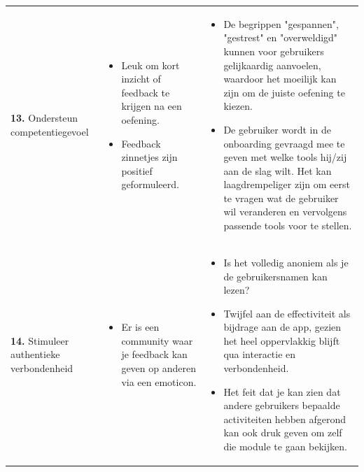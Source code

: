 {\begin{longtable}{
            >{\raggedright\arraybackslash}p{5.23cm}
            >{\raggedright\arraybackslash}p{4.93cm}
            >{\raggedright\arraybackslash}p{4.93cm}
        }
        \addlinespace[5pt]
        
        \textbf{13.} Ondersteun competentiegevoel
        &  
        \begin{itemize}[nosep,leftmargin=*,itemsep=10pt] 
            \renewcommand{\labelitemi}{+} 
            \item Leuk om kort inzicht of feedback te krijgen na een oefening.
            \item Feedback zinnetjes zijn positief geformuleerd.
        \end{itemize} 
        &
        \begin{itemize}[nosep,leftmargin=*,itemsep=10pt] 
            \renewcommand{\labelitemi}{-} 
            \item De begrippen "gespannen", "gestrest" en "overweldigd" kunnen voor gebruikers gelijkaardig aanvoelen, waardoor het moeilijk kan zijn om de juiste oefening te kiezen.
            \item De gebruiker wordt in de onboarding gevraagd mee te geven met welke tools hij/zij aan de slag wilt. Het kan laagdrempeliger zijn om eerst te vragen wat de gebruiker wil veranderen en vervolgens passende tools voor te stellen.
        \end{itemize}
        \\
        
        \addlinespace[5pt]
        
        \textbf{14.} Stimuleer authentieke verbondenheid 
        &  
        \begin{itemize}[nosep,leftmargin=*,itemsep=10pt] 
            \renewcommand{\labelitemi}{+} 
            \item Er is een community waar je feedback kan geven op anderen via een emoticon.
        \end{itemize} 
        &  
        \begin{itemize}[nosep,leftmargin=*,itemsep=10pt] 
            \renewcommand{\labelitemi}{-} 
            \item Is het volledig anoniem als je de gebruikersnamen kan lezen?
            \item Twijfel aan de effectiviteit als bijdrage aan de app, gezien het heel oppervlakkig blijft qua interactie en verbondenheid.
            \item Het feit dat je kan zien dat andere gebruikers bepaalde activiteiten hebben afgerond kan ook druk geven om zelf die module te gaan bekijken.
        \end{itemize} 
        \\
        

\end{longtable}}
